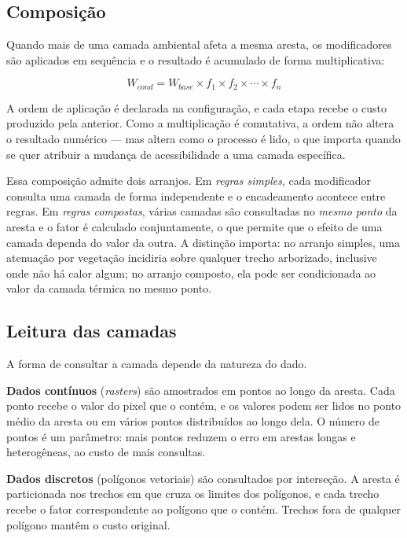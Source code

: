\subsection{Composição}

Quando mais de uma camada ambiental afeta a mesma aresta, os modificadores são
aplicados em sequência e o resultado é acumulado de forma multiplicativa:

\begin{equation}
  W_{cond} = W_{base} \times f_1 \times f_2 \times \cdots \times f_n
\end{equation}

A ordem de aplicação é declarada na configuração, e cada etapa recebe o custo
produzido pela anterior. Como a multiplicação é comutativa, a ordem não altera o
resultado numérico — mas altera como o processo é lido, o que importa quando se
quer atribuir a mudança de acessibilidade a uma camada específica.

Essa composição admite dois arranjos. Em \emph{regras simples}, cada modificador
consulta uma camada de forma independente e o encadeamento acontece entre regras.
Em \emph{regras compostas}, várias camadas são consultadas no \emph{mesmo ponto}
da aresta e o fator é calculado conjuntamente, o que permite que o efeito de uma
camada dependa do valor da outra. A distinção importa: no arranjo simples, uma
atenuação por vegetação incidiria sobre qualquer trecho arborizado, inclusive onde
não há calor algum; no arranjo composto, ela pode ser condicionada ao valor da
camada térmica no mesmo ponto.

\subsection{Leitura das camadas}

A forma de consultar a camada depende da natureza do dado.

\textbf{Dados contínuos} (\textit{rasters}) são amostrados em pontos ao longo da
aresta. Cada ponto recebe o valor do pixel que o contém, e os valores podem ser
lidos no ponto médio da aresta ou em vários pontos distribuídos ao longo dela. O
número de pontos é um parâmetro: mais pontos reduzem o erro em arestas longas e
heterogêneas, ao custo de mais consultas.

\textbf{Dados discretos} (polígonos vetoriais) são consultados por interseção. A
aresta é particionada nos trechos em que cruza os limites dos polígonos, e cada
trecho recebe o fator correspondente ao polígono que o contém. Trechos fora de
qualquer polígono mantêm o custo original.

